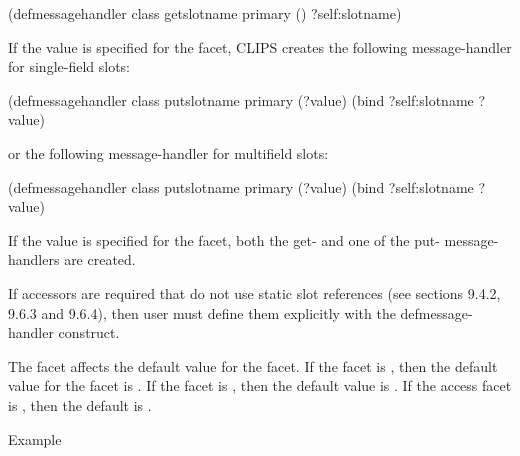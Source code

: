 \documentclass[letterpaper,10pt,english]{sphinxmanual}
\begin{document}
\begin{sphinxVerbatim}[commandchars=\\\{\}]
(defmessage\PYGZhy{}handler \PYGZlt{}class\PYGZgt{} get\PYGZhy{}\PYGZlt{}slot\PYGZhy{}name\PYGZgt{} primary ()
  ?self:\PYGZlt{}slot\PYGZhy{}name\PYGZgt{})
\end{sphinxVerbatim}

If the value  is specified for the facet, CLIPS creates the
following message-handler for single-field slots:

\begin{sphinxVerbatim}[commandchars=\\\{\}]
(defmessage\PYGZhy{}handler \PYGZlt{}class\PYGZgt{} put\PYGZhy{}\PYGZlt{}slot\PYGZhy{}name\PYGZgt{} primary (?value)
  (bind ?self:\PYGZlt{}slot\PYGZhy{}name\PYGZgt{} ?value)
\end{sphinxVerbatim}

or the following message-handler for multifield slots:

\begin{sphinxVerbatim}[commandchars=\\\{\}]
(defmessage\PYGZhy{}handler \PYGZlt{}class\PYGZgt{} put\PYGZhy{}\PYGZlt{}slot\PYGZhy{}name\PYGZgt{} primary (\PYGZdl{}?value)
  (bind ?self:\PYGZlt{}slot\PYGZhy{}name\PYGZgt{} ?value)
\end{sphinxVerbatim}

If the value  is specified for the facet, both the get-
and one of the put- message-handlers are created.

If accessors are required that do not use static slot references (see
sections 9.4.2, 9.6.3 and 9.6.4), then user must define them explicitly
with the defmessage-handler construct.

The  facet affects the default value for the
 facet. If the  facet is ,
then the default value for the  facet is
. If the  facet is , then the
default value is . If the access facet is ,
then the default is .

Example
\end{document}
